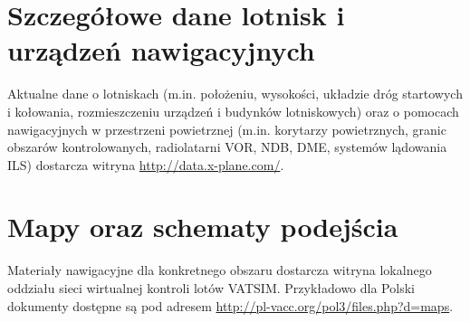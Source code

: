 \documentclass{mwrep}
\begin{document}
\section{Szczegółowe dane lotnisk i urządzeń nawigacyjnych}
Aktualne dane o lotniskach (m.in. położeniu, wysokości, układzie dróg startowych i kołowania, rozmieszczeniu urządzeń i budynków lotniskowych) oraz o pomocach nawigacyjnych w przestrzeni powietrznej (m.in. korytarzy powietrznych, granic obszarów kontrolowanych, radiolatarni VOR, NDB, DME, systemów lądowania ILS) dostarcza witryna \url{http://data.x-plane.com/}.

\section{Mapy oraz schematy podejścia}
Materiały nawigacyjne dla konkretnego obszaru dostarcza witryna lokalnego oddziału sieci wirtualnej kontroli lotów VATSIM. Przykładowo dla Polski dokumenty dostępne są pod adresem \url{http://pl-vacc.org/pol3/files.php?d=maps}.
\end{document}
